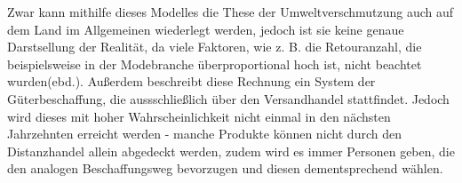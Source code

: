 \begin{folding}
\begin{itemize}
\end{itemize}
Zwar kann mithilfe dieses Modelles die These der Umweltverschmutzung auch auf dem Land im Allgemeinen wiederlegt werden, jedoch ist sie keine genaue Darstsellung der Realität, da viele Faktoren, wie z. B. die Retouranzahl, die beispielsweise in der Modebranche überproportional hoch ist, nicht beachtet wurden(ebd.). Außerdem beschreibt diese Rechnung ein System der Güterbeschaffung, die aussschließlich über den Versandhandel stattfindet. Jedoch wird dieses mit hoher Wahrscheinlichkeit nicht einmal in den nächsten Jahrzehnten erreicht werden - manche Produkte können nicht durch den Distanzhandel allein abgedeckt werden, zudem wird es immer Personen geben, die den analogen Beschaffungsweg bevorzugen und diesen dementsprechend wählen.

\end{folding}

